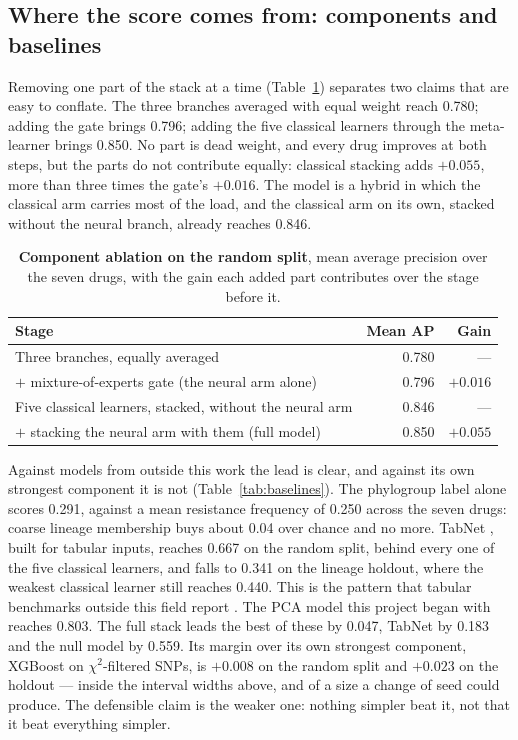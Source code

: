\subsection*{Where the score comes from: components and baselines}

Removing one part of the stack at a time (Table~\ref{tab:ablation}) separates two claims that are
easy to conflate. The three branches averaged with equal weight reach 0.780; adding the gate brings
0.796; adding the five classical learners through the meta-learner brings 0.850. No part is dead
weight, and every drug improves at both steps, but the parts do not contribute equally: classical
stacking adds $+0.055$, more than three times the gate's $+0.016$. The model is a hybrid in which
the classical arm carries most of the load, and the classical arm on its own, stacked without the
neural branch, already reaches 0.846.

\begin{table}[t]\centering\small
\caption{\textbf{Component ablation on the random split}, mean average precision over the seven
drugs, with the gain each added part contributes over the stage before it.}
\label{tab:ablation}
\begin{tabular}{lrr}
\toprule
Stage & Mean AP & Gain \\
\midrule
Three branches, equally averaged & 0.780 & --- \\
$+$ mixture-of-experts gate (the neural arm alone) & 0.796 & $+0.016$ \\
Five classical learners, stacked, without the neural arm & 0.846 & --- \\
$+$ stacking the neural arm with them (full model) & 0.850 & $+0.055$ \\
\bottomrule
\end{tabular}
\end{table}

Against models from outside this work the lead is clear, and against its own strongest component it
is not (Table~\ref{tab:baselines}). The phylogroup label alone scores 0.291, against a mean
resistance frequency of 0.250 across the seven drugs: coarse lineage membership buys about 0.04
over chance and no more. TabNet \cite{arik2021tabnet}, built for tabular inputs, reaches 0.667 on
the random split, behind every one of the five classical learners, and falls to 0.341 on the
lineage holdout, where the weakest classical learner still reaches 0.440. This is the pattern that
tabular benchmarks outside this field report \cite{grinsztajn2022trees,shwartzziv2022tabular}. The
PCA model this project began with reaches 0.803. The full stack leads the best of these by 0.047,
TabNet by 0.183 and the null model by 0.559. Its margin over its own strongest component, XGBoost
on $\chi^2$-filtered SNPs, is $+0.008$ on the random split and $+0.023$ on the holdout --- inside
the interval widths above, and of a size a change of seed could produce. The defensible claim is
the weaker one: nothing simpler beat it, not that it beat everything simpler.

